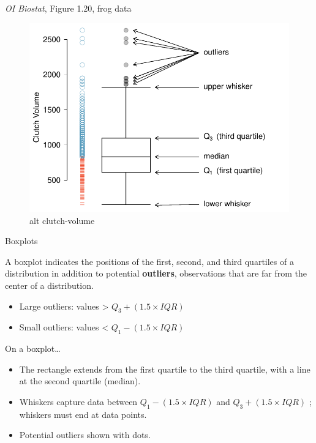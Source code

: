 \documentclass[
  ignorenonframetext,
]{beamer}
\begin{document}
\begin{frame}{\emph{OI Biostat}, Figure 1.20, frog data}
\protect\hypertarget{oi-biostat-figure-1.20-frog-data}{}

\begin{figure}
\centering
\includegraphics{figures/frogBoxPlot.pdf}
\caption{alt clutch-volume}
\end{figure}

\end{frame}

\begin{frame}{Boxplots}
\protect\hypertarget{boxplots}{}

A boxplot indicates the positions of the first, second, and third
quartiles of a distribution in addition to potential \textbf{outliers},
observations that are far from the center of a distribution.

\begin{itemize}
\item
  Large outliers: values \textgreater{} \(Q_3 + (1.5\times IQR)\)
\item
  Small outliers: values \textless{} \(Q_1 - (1.5 \times IQR)\)
\end{itemize}

On a boxplot\ldots{}

\begin{itemize}
\item
  The rectangle extends from the first quartile to the third quartile,
  with a line at the second quartile (median).
\item
  Whiskers capture data between \(Q_1 - (1.5 \times IQR)\) and
  \(Q_3 + (1.5\times IQR)\) ; whiskers must end at data points.
\item
  Potential outliers shown with dots.
\end{itemize}

\end{frame}
\end{document}
